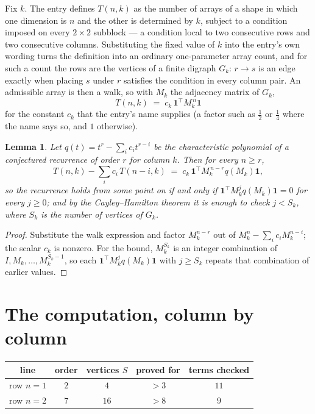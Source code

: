 \documentclass[11pt,a4paper]{article}
\theoremstyle{plain}
\newtheorem{lemma}[theorem]{Lemma}
\theoremstyle{definition}
\begin{document}
Fix $k$. The entry defines $T(n,k)$ as the number of arrays of a shape in which one dimension
is $n$ and the other is determined by $k$, subject to a condition imposed on every
$2\times2$ subblock --- a condition local to two consecutive rows and two consecutive columns.
Substituting the fixed value of $k$ into the entry's own wording turns the definition into an
ordinary one-parameter array count, and for such a count the rows are the vertices of a finite
digraph $G_k$: $r\to s$ is an edge exactly when placing $s$ under $r$ satisfies the condition
in every column pair. An admissible array is then a walk, so with $M_k$ the adjacency matrix
of $G_k$,
\[
T(n,k)\;=\;c_k\,\mathbf{1}^{\!\top}M_k^{\,n}\mathbf{1}
\]
for the constant $c_k$ that the entry's name supplies (a factor such as $\tfrac12$ or
$\tfrac14$ where the name says so, and $1$ otherwise).

\begin{lemma}\label{lem:crit}
Let $q(t)=t^{r}-\sum_i c_it^{r-i}$ be the characteristic polynomial of a conjectured
recurrence of order $r$ for column $k$. Then for every $n\ge r$,
\[
T(n,k)-\sum_i c_i\,T(n-i,k)\;=\;c_k\,\mathbf{1}^{\!\top}M_k^{\,n-r}q(M_k)\mathbf{1},
\]
so the recurrence holds from some point on if and only if
$\mathbf{1}^{\!\top}M_k^{j}q(M_k)\mathbf{1}=0$ for every $j\ge0$; and by the
Cayley--Hamilton theorem it is enough to check $j<S_k$, where $S_k$ is the number of vertices
of $G_k$.
\end{lemma}

\begin{proof}
Substitute the walk expression and factor $M_k^{n-r}$ out of $M_k^{n}-\sum_ic_iM_k^{n-i}$;
the scalar $c_k$ is nonzero. For the bound, $M_k^{S_k}$ is an integer combination of
$I,M_k,\dots,M_k^{S_k-1}$, so each $\mathbf{1}^{\!\top}M_k^{j}q(M_k)\mathbf{1}$ with
$j\ge S_k$ repeats that combination of earlier values.
\end{proof}

\section{The computation, column by column}

\begin{center}
\begin{tabular}{ccccc}
line & order & vertices $S$ & proved for & terms checked \\ \hline
row $n$$=1$ & $2$ & $4$ & $>3$ & $11$ \\
row $n$$=2$ & $7$ & $16$ & $>8$ & $9$ \\
\end{tabular}
\end{center}
\end{document}
